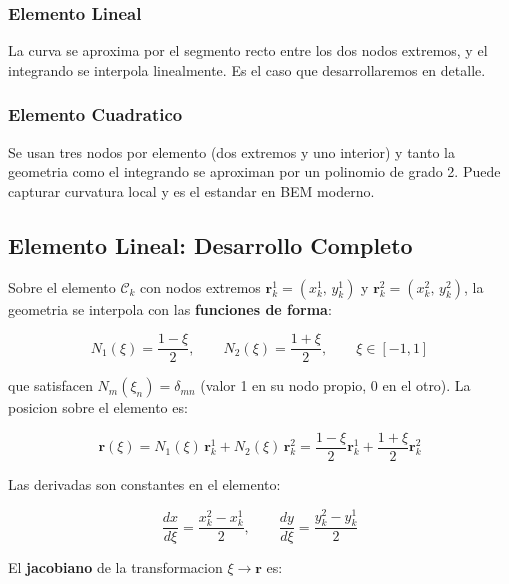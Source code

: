 \documentclass[12pt,a4paper]{article}
\begin{document}
\subsubsection{Elemento Lineal}

La curva se aproxima por el segmento recto entre los dos nodos extremos,
y el integrando se interpola linealmente. Es el caso que desarrollaremos
en detalle.

\subsubsection{Elemento Cuadratico}

Se usan tres nodos por elemento (dos extremos y uno interior) y tanto la
geometria como el integrando se aproximan por un polinomio de grado 2.
Puede capturar curvatura local y es el estandar en BEM moderno.

\subsection{Elemento Lineal: Desarrollo Completo}

Sobre el elemento $\mathcal{C}_k$ con nodos extremos
$\mathbf{r}_k^1 = (x_k^1,\, y_k^1)$ y $\mathbf{r}_k^2 = (x_k^2,\, y_k^2)$,
la geometria se interpola con las \textbf{funciones de forma}:

\begin{equation}
    N_1(\xi) = \frac{1-\xi}{2}, \qquad N_2(\xi) = \frac{1+\xi}{2},
    \qquad \xi \in [-1,1]
\end{equation}

que satisfacen $N_m(\xi_n) = \delta_{mn}$ (valor 1 en su nodo propio,
0 en el otro). La posicion sobre el elemento es:

\begin{equation}
    \mathbf{r}(\xi) = N_1(\xi)\,\mathbf{r}_k^1 + N_2(\xi)\,\mathbf{r}_k^2
    = \frac{1-\xi}{2}\mathbf{r}_k^1 + \frac{1+\xi}{2}\mathbf{r}_k^2
    \label{eq:interp_elem}
\end{equation}

Las derivadas son constantes en el elemento:

\begin{equation}
    \frac{dx}{d\xi} = \frac{x_k^2 - x_k^1}{2}, \qquad
    \frac{dy}{d\xi} = \frac{y_k^2 - y_k^1}{2}
    \label{eq:derivadas}
\end{equation}

El \textbf{jacobiano} de la transformacion $\xi \to \mathbf{r}$ es:
\end{document}
